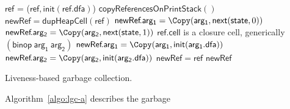 \documentclass[preprint,9pt]{sigplanconf}
\begin{document}
\label{sec:live-clo}
  \SetStartEndCondition{ }{}{}%
  \AlgoDontDisplayBlockMarkers\SetAlgoNoEnd\SetAlgoNoLine%
\begin{algorithm}[t]
  \Pro{\Lgc{}}
     {
            {$\mathsf{ref}$ = \Copy($\mathsf{ref}, \mathsf{init}(\mathsf{ref.dfa})$)\;}
            ${\mathsf{copyReferencesOnPrintStack}()}$\;  
     }
        {
             {
               $\mathsf{newRef} = \mathsf{dupHeapCell}(\mathsf{ref})$\;
                  {
                    {
                      $\mathsf{newRef}\!.\mathsf{arg_1}  = \Copy(\mathsf{arg_1}, \mathsf{next}(\mathsf{state}, 0))$\;
                    }
                    {
                      $\mathsf{newRef}\!.\mathsf{arg_2} =  \Copy(\mathsf{arg_2},
                      \mathsf{next}(\mathsf{state} , 1))$\;
                    }    
                  }
               \If
                  {$\mathsf{ref\!.cell}$ is a
                    closure cell, generically  $\mathsf{(binop~arg_1~arg_2)}$}
                   { 
                     $\mathsf{newRef}\!.\mathsf{arg_1} = \Copy(\mathsf{arg_1}, \mathsf{init}(\mathsf{arg_1.dfa}))$\;
                     $\mathsf{newRef}\!.\mathsf{arg_2} = \Copy(\mathsf{arg_2}, \mathsf{init}(\mathsf{arg_2.dfa}))$\;
                   }
             }
             {$\mathsf{newRef = ref}$}
\KwRet $\mathsf{newRef}$\;
        }
        \caption{Liveness-based
          garbage collection.  \label{algo:lgc-a}}
\end{algorithm}
Algorithm~\ref{algo:lgc-a}   describes   the   garbage
\end{document}
